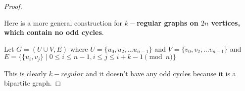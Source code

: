 \documentclass[12pt]{article}
\begin{document}
\begin{proof}
\begin{center}
\end{center}

Here is a more general construction for \textbf{$k-$regular graphs on $2n$ vertices, which contain no odd cycles}.

Let $G = (U \cup V, E)$ where $U=\{u_0,u_2,\ldots u_{n-1}\}$ and $V=\{v_0,v_2,\ldots v_{n-1}\}$ and $E = \{\{u_i,v_j\} \mid 0 \leq i \leq n-1, i \leq j \leq  i+k-1 \pmod n\}$

This is clearly $k-regular$ and it doesn't have any odd cycles because it is a bipartite graph.

\end{proof}

\newpage
\end{document}

